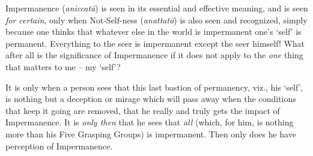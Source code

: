 Impermanence (\textit{aniccatā}) is seen in its essential and effective meaning, and is seen \emph{for certain}, only when Not-Self-ness (\textit{anattatā}) is also seen and recognized, simply because one thinks that whatever else in the world is impermanent one's `self' is permanent. Everything to the seer is impermanent except the seer himself! What after all is the significance of Impermanence if it does not apply to the \emph{one} thing that matters to me -- my `self'?

It is only when a person sees that this last bastion of permanency, viz., his `self', is nothing but a deception or mirage which will pass away when the conditions that keep it going are removed, that he really and truly gets the impact of Impermanence. It is \emph{only then} that he sees that \emph{all} (which, for him, is nothing more than his Five Grasping Groups) is impermanent. Then only does he have perception of Impermanence.
